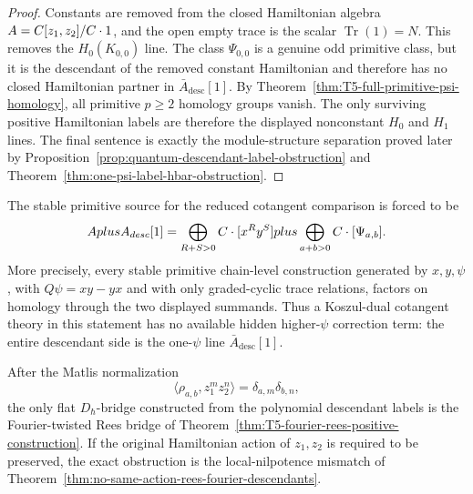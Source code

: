 \begin{proof}
  Constants are removed from the closed Hamiltonian algebra
  \(A=C[z_1,z_2]/C\cdot1\), and the open empty trace is the scalar
  \(\operatorname{Tr}(1)=N\).  This removes the \(H_0(K_{0,0})\) line.
  The class \(\Psi_{0,0}\) is a genuine odd primitive class, but it is the
  descendant of the removed constant Hamiltonian and therefore has no
  closed Hamiltonian partner in \(\bar A_{\mathrm{desc}}[1]\).  By
  Theorem~\ref{thm:T5-full-primitive-psi-homology}, all primitive
  \(p\ge2\) homology groups vanish.  The only surviving positive
  Hamiltonian labels are therefore the displayed nonconstant \(H_0\) and
  \(H_1\) lines.  The final sentence is exactly the module-structure
  separation proved later by
  Proposition~\ref{prop:quantum-descendant-label-obstruction} and
  Theorem~\ref{thm:one-psi-label-hbar-obstruction}.
\end{proof}

\begin{thm}
  \label{thm:T5-universal-primitive-descendant-envelope}
  The stable primitive source for the reduced cotangent comparison is forced
  to be
  \[
    AplusA_{desc}[1]
    =
    \bigoplus_{R+S>0}C\cdot[x^Ry^S]
      plus
    \bigoplus_{a+b>0}C\cdot[\Psi_{a,b}].
  \]
  More precisely, every stable primitive chain-level construction generated
  by \(x,y,\psi\), with \(Q\psi=xy-yx\) and with only graded-cyclic trace
  relations, factors on homology through the two displayed summands.  Thus
  a Koszul-dual cotangent theory in this statement has no available
  hidden higher-\(\psi\) correction term: the entire descendant side is the
  one-\(\psi\) line \(\bar A_{\mathrm{desc}}[1]\).

  After the Matlis normalization
  \[
    \langle\rho_{a,b},z_1^m z_2^n\rangle
      =\delta_{a,m}\delta_{b,n},
  \]
  the only flat \(D_\hbar\)-bridge constructed from the polynomial
  descendant labels is the Fourier-twisted Rees bridge of
  Theorem~\ref{thm:T5-fourier-rees-positive-construction}.  If the original
  Hamiltonian action of \(z_1,z_2\) is required to be preserved, the exact
  obstruction is the local-nilpotence mismatch of
  Theorem~\ref{thm:no-same-action-rees-fourier-descendants}.
\end{thm}

